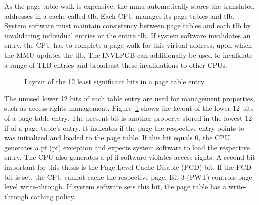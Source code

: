 As the page table walk is expensive, the \gls{mmu} automatically stores
the translated addresses in a cache called \gls{tlb}.
Each CPU manages its page tables and \gls{tlb}. System software must
maintain consistency between page tables and each \gls{tlb} by
invalidating individual entries or the entire \gls{tlb}. If system
software invalidates an entry, the CPU has to complete a page walk for this
virtual address, upon which the MMU updates the \gls{tlb}. The INVLPGB
can additionally be used to invalidate a range of TLB entries and broadcast
these invalidations to other CPUs. \\

\begin{figure}
    \begin{center}
        
        \caption{Layout of the 12 least significant bits in a page table entry}
        \label{fig:state:technical:paging_rights}
    \end{center}
\end{figure}

The unused lower 12 bits of each table entry are used for management properties,
such as access rights management. Figure~\ref{fig:state:technical:paging_rights}
shows the layout of the lower 12 bits of a page table entry. The present bit is
another property stored in the lowest 12 if of a page table's entry. It
indicates if the page the respective entry points to was initialized and loaded
to the page table. If this bit equals 0, the CPU generates a \gls{pf}
(\gls{pf}) exception and expects system software to load the respective
entry. The CPU also generates a \gls{pf} if software violates access
rights. A second bit important for this thesis is the Page-Level Cache Disable
(PCD) bit. If the PCD bit is set, the CPU cannot cache the respective page. Bit
3 (PWT) controls page-level write-through. If system software sets this bit, the
page table has a write-through caching policy.
